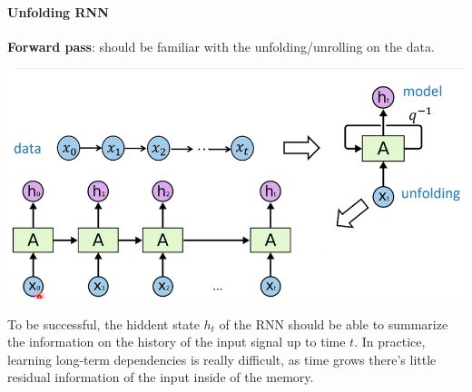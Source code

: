 \documentclass[10pt]{report}
\begin{document}
\paragraph{Unfolding RNN} \textbf{Forward pass}: should be familiar with the unfolding/unrolling on the data.\begin{center}
	\includegraphics[scale=0.5]{92.png}
\end{center}
To be successful, the hiddent state $h_t$ of the RNN should be able to summarize the information on the history of the input signal up to time $t$. In practice, learning long-term dependencies is really difficult, as time grows there's little residual information of the input inside of the memory.
\end{document}
